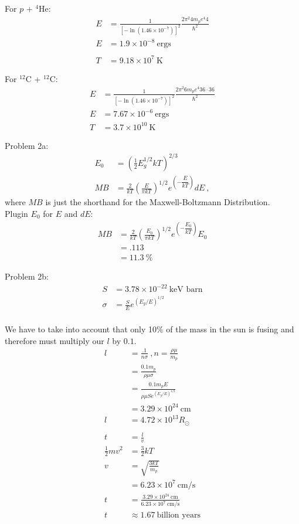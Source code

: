 \documentclass[10pt,a4paper,preprint]{aastex}
\begin{document}
For $p$ + $^4$He:
\begin{align}
E & = \frac{1}{[-\ln (1.46 \times 10^{-7})]^2}\frac{2 \pi^2 4 m_p e^4 4}{\hbar^2}\\
E & = 1.9 \times 10^{-8} ~\text{ergs}\\
\\
T & = 9.18 \times 10^7~\text{K}
\end{align}

For $^{12}$C + $^{12}$C:
\begin{align}
E & = \frac{1}{[-\ln (1.46 \times 10^{-7})]^2}\frac{2 \pi^2 6 m_p e^4 36 \cdot 36}{\hbar^2}\\
E & = 7.67 \times 10^{-6}~\text{ergs}
\\
T & = 3.7 \times 10^{10}~\text{K}
\end{align}


Problem 2a:
\begin{align}
E_0 & = \left( \frac{1}{2}E_g^{1/2}kT \right)^{2/3}\\
MB & = \frac{2}{kT} \left( \frac{E}{\pi kT} \right)^{1/2} e^{\left( - \dfrac{E}{kT} \right)} dE~,
\end{align}
where $MB$ is just the shorthand for the Maxwell-Boltzmann Distribution.\\
Plugin $E_0$ for $E$ and $dE$:
\begin{align}
MB & = \frac{2}{kT} \left( \frac{E_0}{\pi kT} \right)^{1/2} e^{\left( - \dfrac{E_0}{kT} \right)} E_0\\
& = .113\\
& = 11.3 ~\%
\end{align}

Problem 2b:
\begin{align}
S & = 3.78 \times 10^{-22} ~\text{keV barn}\\
\sigma & = \frac{S}{E}e^{(E_g/E)^{1/2}}\\
\end{align}

We have to take into account that only 10\% of the mass in the sun is fusing and therefore must multiply our $l$ by $0.1$.
\begin{align}
l &= \frac{.1}{n \sigma} ~,n=\frac{\rho \mu}{m_p}\\
& = \frac{0.1 m_p}{\rho \mu \sigma}\\
& = \frac{0.1m_p E}{\rho \mu S e^{(E_g/E)^{1/2}}}\\
& = 3.29 \times 10^{24}~\text{cm}\\
l & = 4.72 \times 10^{13}R_\odot\\
\\
t& = \frac{l}{v}\\
\frac{1}{2}mv^2 & = \frac{3}{2}kT\\
v & = \sqrt{\frac{3kT}{m_p}}\\
 & = 6.23 \times 10^7 ~\text{cm/s}\\
t & = \frac{3.29 \times 10^{24}~\text{cm}}{6.23 \times 10^7 ~\text{cm/s}}\\
t & \approx 1.67 ~\text{billion years}
\end{align}
\end{document}
